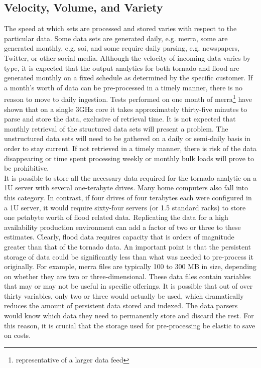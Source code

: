 \subsection{Velocity, Volume, and Variety}
The speed at which sets are processed and stored varies with respect to the particular data. Some data sets are generated daily, e.g. \gls{merra}, some are generated monthly, e.g. \gls{soi}, and some require daily parsing, e.g. newspapers, Twitter, or other social media. Although the velocity of incoming data varies by type, it is expected that the output analytics for both tornado and flood are generated monthly on a fixed schedule as determined by the specific customer. If a month's worth of data can be pre-processed in a timely manner, there is no reason to move to daily ingestion. Tests performed on one month of \gls{merra}\footnote{representative of a larger data feed} have shown that on a single 3GHz core it takes approximately thirty-five minutes to parse and store the data, exclusive of retrieval time. It is not expected that monthly retrieval of the structured data sets will present a problem. The unstructured data sets will need to be gathered on a daily or semi-daily basis in order to stay current. If not retrieved in a timely manner, there is risk of the data disappearing or time spent processing weekly or monthly bulk loads will prove to be prohibitive.\\

It is possible to store all the necessary data required for the tornado analytic on a 1U server with several one-terabyte drives. Many home computers also fall into this category. In contrast, if four drives of four terabytes each were configured in a 1U server, it would require sixty-four servers  (or 1.5 standard racks) to store one petabyte worth of flood related data. Replicating the data for a high availability production environment can add a factor of two or three to these estimates. Clearly, flood data requires capacity that is orders of magnitude greater than that of the tornado data. An important point is that the persistent storage of data could be significantly less than what was needed to pre-process it originally. For example, \gls{merra} files are typically 100 to 300 MB in size, depending on whether they are two or three-dimensional. These data files contain variables that may or may not be useful in specific offerings. It is possible that out of over thirty variables, only two or three would actually be used, which dramatically reduces the amount of persistent data stored and indexed. The data parsers would know which data they need to permanently store and discard the rest. For this reason, it is crucial that the storage used for pre-processing be elastic to save on costs.\\

